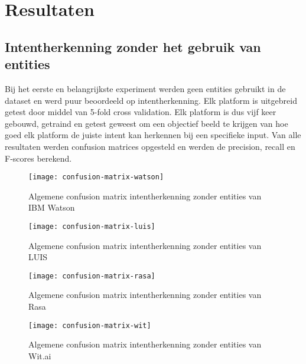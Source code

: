 
\chapter{Resultaten}
\label{ch:resultaten}

\section{Intentherkenning zonder het gebruik van entities}
\label{intent}

Bij het eerste en belangrijkste experiment werden geen entities gebruikt in de dataset en werd puur beoordeeld op intentherkenning. Elk platform is uitgebreid getest door middel van 5-fold cross validation. Elk platform is dus vijf keer gebouwd, getraind en getest geweest om een objectief beeld te krijgen van hoe goed elk platform de juiste intent kan herkennen bij een specifieke input. Van alle resultaten werden confusion matrices opgesteld en werden de precision, recall en F-scores berekend.

\begin{figure}[H]
    \label{fig:confusion-matrix-watson}
    \centering
    \texttt{[image: confusion-matrix-watson]}
    \caption{Algemene confusion matrix intentherkenning zonder entities van IBM Watson}
\end{figure}

\begin{figure}[H]
    \label{fig:confusion-matrix-luis}
    \centering
    \texttt{[image: confusion-matrix-luis]}
    \caption{Algemene confusion matrix intentherkenning zonder entities van LUIS}
\end{figure}

\begin{figure}[H]
    \label{fig:confusion-matrix-rasa}
    \centering
    \texttt{[image: confusion-matrix-rasa]}
    \caption{Algemene confusion matrix intentherkenning zonder entities van Rasa}
\end{figure}

\begin{figure}[H]
    \label{fig:confusion-matrix-wit}
    \centering
    \texttt{[image: confusion-matrix-wit]}
    \caption{Algemene confusion matrix intentherkenning zonder entities van Wit.ai}
\end{figure}

